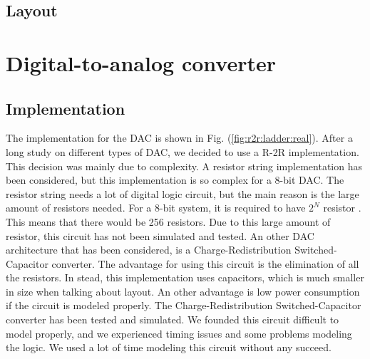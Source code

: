 \documentclass[english, 12pt, a4paper]{ifimaster}
\begin{document}
\subsection{Layout}



\section{Digital-to-analog converter}
\subsection{Implementation}
The implementation for the DAC is shown in Fig. (\ref{fig:r2r:ladder:real}). After a long study on different types of DAC, we decided to use a R-2R implementation. This decision was mainly due to 
complexity. A resistor string implementation has been considered, but this implementation is so complex for a 8-bit DAC. The resistor string needs a lot of digital logic circuit, but the main 
reason is the large amount of resistors needed. For a 8-bit system, it is required to have \(2^N\) resistor \cite{carusone}. This means that there would be 256 resistors. Due to this large amount of resistor, 
this circuit has not been simulated and tested. An other DAC architecture that has been considered, is a Charge-Redistribution Switched-Capacitor converter. The advantage for using this circuit 
is the elimination of all the resistors. In stead, this implementation uses capacitors, which is much smaller in size when talking about layout. An other advantage is low power consumption if the
circuit is modeled properly. The Charge-Redistribution Switched-Capacitor converter has been tested and simulated. We founded this circuit difficult to model properly, and we experienced 
timing issues and some problems modeling the logic. We used a lot of time modeling this circuit without any succeed.\\
\end{document}

